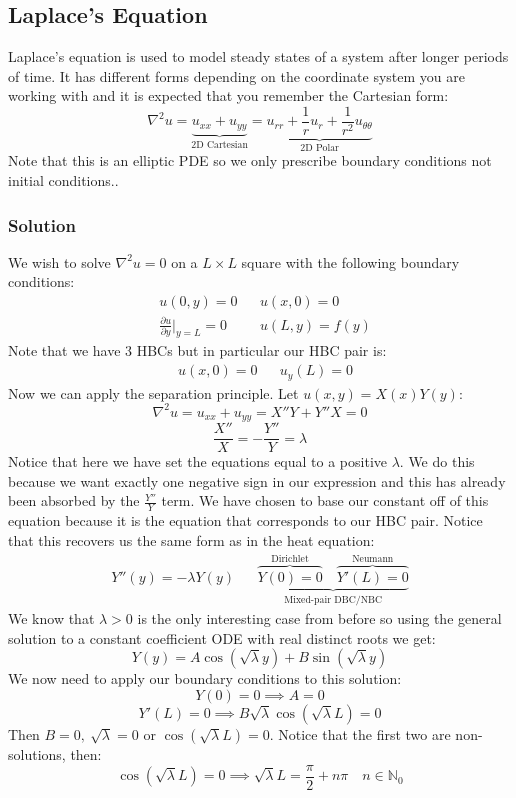 \documentclass[12pt]{article}
\newcommand{\pf}[2]{\frac{\partial #1}{\partial #2}}
\begin{document}
\subsection{Laplace's Equation}
Laplace's equation is used to model steady states of a system after longer periods of time. It has different forms depending on the coordinate system you are working with and it is expected that you remember the Cartesian form:
\[\nabla^2u=\underbrace{u_{xx}+u_{yy}}_\text{2D Cartesian}=\underbrace{u_{rr}+\frac{1}{r}u_{r}+\frac{1}{r^2}u_{\theta\theta}}_{\text{2D Polar}}\]
Note that this is an elliptic PDE so we only prescribe boundary conditions not initial conditions..
\subsubsection{Solution}
We wish to solve \(\nabla^2u=0\) on a \(L\times L\) square with the following boundary conditions:
\begin{align*}
    &u(0,y)=0 && u(x,0)=0 \\
    &\pf{u}{y}|_{y=L}=0 && u(L,y)=f(y)
\end{align*}
Note that we have 3 HBCs but in particular our HBC pair is:
\begin{align*}
    &u(x,0)=0 && u_y(L)=0
\end{align*}
Now we can apply the separation principle. Let \(u(x,y)=X(x)Y(y)\):
\[\nabla^2u=u_{xx}+u_{yy}=X''Y+Y''X=0\]
\[\frac{X''}{X}=-\frac{Y''}{Y}=\lambda\]
Notice that here we have set the equations equal to a positive \(\lambda\). We do this because we want exactly one negative sign in our expression and this has already been absorbed by the \(\frac{Y''}{Y}\) term. We have chosen to base our constant off of this equation because it is the equation that corresponds to our HBC pair. Notice that this recovers us the same form as in the heat equation:
\begin{align*}
    Y''(y)=-\lambda Y(y) && \underbrace{\overbrace{Y(0)=0}^{\text{Dirichlet}}\quad \overbrace{Y'(L)=0}^{\text{Neumann}}}_{\text{Mixed-pair DBC/NBC}}
\end{align*}
We know that \(\lambda>0\) is the only interesting case from before so using the general solution to a constant coefficient ODE with real distinct roots we get:
\[Y(y)=A\cos(\sqrt{\lambda}y)+B\sin(\sqrt{\lambda}y)\]
We now need to apply our boundary conditions to this solution:
\[Y(0)=0\implies A=0\]
\[Y'(L)=0\implies B\sqrt{\lambda}\cos(\sqrt{\lambda}L)=0\]
Then \(B=0,\ \sqrt{\lambda}=0\) or \(\cos(\sqrt{\lambda}L)=0\). Notice that the first two are non-solutions, then:
\[\cos(\sqrt{\lambda}L)=0\implies \sqrt{\lambda}L=\frac{\pi}{2}+n\pi\quad n\in\mathbb{N}_0\]
\end{document}
